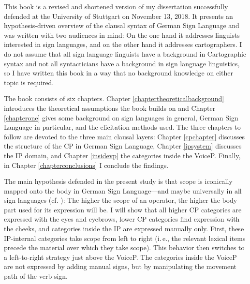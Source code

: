 

\begin{refsection}

This book is a revised and shortened version of my dissertation successfully defended at the University of Stuttgart on November 13, 2018. It presents an hypothesis-driven overview of the clausal syntax of German Sign Language and was written with two audiences in mind: On the one hand it addresses linguists interested in sign languages, and on the other hand it addresses cartographers. I do not assume that all sign language linguists have a background in Cartographic syntax and not all syntacticians have a background in sign language linguistics, so I have written this book in a way that no background knowledge on either topic is required.

The book consists of six chapters. Chapter \ref{chaptertheoreticalbackground} introduces the theoretical assumptions the book builds on and Chapter \ref{chapterone} gives some background on sign languages in general, German Sign Language in particular, and the elicitation methods used. The three chapters to follow are devoted to the three main clausal layers: Chapter \ref{cpchapter} discusses the structure of the CP in German Sign Language, Chapter \ref{ipsystem} discusses the IP domain, and Chapter \ref{insidevp} the categories inside the VoiceP. Finally, in Chapter \ref{chapterconclusions} I conclude the findings.

The main hypothesis defended in the present study is that scope is iconically mapped onto the body in German Sign Language---and maybe universally in all sign languages (cf. \citealt{bross2017scope}): The higher the scope of an operator, the higher the body part used for its expression will be. I will show that all higher CP categories are expressed with the eyes and eyebrows, lower CP categories find expression with the cheeks, and categories inside the IP are expressed manually only. First, these IP-internal categories take scope from left to right (i.\,e., the relevant lexical items precede the material over which they take scope). This behavior then switches to a left-to-right strategy just above the VoiceP. The categories inside the VoiceP are not expressed by adding manual signs, but by manipulating the movement path of the verb sign. 

\printbibliography[heading=subbibliography]
\end{refsection}